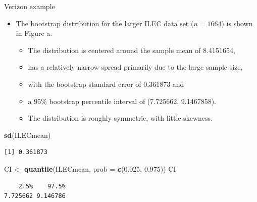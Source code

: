 \documentclass[
  ignorenonframetext,
]{beamer}
\newenvironment{Shaded}{\begin{snugshade}}{\end{snugshade}}
\newcommand{\AttributeTok}[1]{\textcolor[rgb]{0.13,0.29,0.53}{#1}}
\newcommand{\FloatTok}[1]{\textcolor[rgb]{0.00,0.00,0.81}{#1}}
\newcommand{\FunctionTok}[1]{\textcolor[rgb]{0.13,0.29,0.53}{\textbf{#1}}}
\newcommand{\NormalTok}[1]{#1}
\newcommand{\OtherTok}[1]{\textcolor[rgb]{0.56,0.35,0.01}{#1}}
\providecommand{\tightlist}{%
  \setlength{\itemsep}{0pt}\setlength{\parskip}{0pt}}
\begin{document}
\begin{frame}[fragile]{Verizon example}
\label{verizon-example-3}
\begin{itemize}
\item
  The bootstrap distribution for the larger ILEC data set (\(n=1664\))
  is shown in Figure a.

  \begin{itemize}
  \tightlist
  \item
    The distribution is centered around the sample mean of 8.4151654,
  \item
    has a relatively narrow spread primarily due to the large sample
    size,
  \item
    with the bootstrap standard error of 0.361873 and
  \item
    a \(95\%\) bootstrap percentile interval of (7.725662, 9.1467858).
  \item
    The distribution is roughly symmetric, with little skewness.
  \end{itemize}
\end{itemize}

\small

\begin{Shaded}
\begin{Highlighting}[]
\FunctionTok{sd}\NormalTok{(ILECmean)}
\end{Highlighting}
\end{Shaded}

\begin{verbatim}
[1] 0.361873
\end{verbatim}

\begin{Shaded}
\begin{Highlighting}[]
\NormalTok{CI }\OtherTok{\textless{}{-}} \FunctionTok{quantile}\NormalTok{(ILECmean, }\AttributeTok{prob =} \FunctionTok{c}\NormalTok{(}\FloatTok{0.025}\NormalTok{, }\FloatTok{0.975}\NormalTok{))}
\NormalTok{CI}
\end{Highlighting}
\end{Shaded}

\begin{verbatim}
    2.5%    97.5% 
7.725662 9.146786 
\end{verbatim}

\normalsize
\end{frame}
\end{document}
